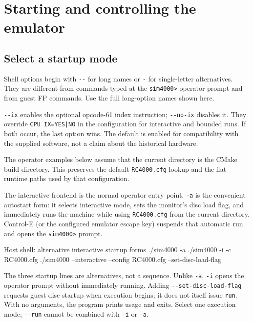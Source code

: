 \chapter{Starting and controlling the emulator}\label{command-line-options}

\section{Select a startup mode}\label{select-a-startup-mode}

Shell options begin with \passthrough{\lstinline!--!} for long names or \passthrough{\lstinline!-!} for single-letter alternatives. They are different from commands typed at the \passthrough{\lstinline!sim4000>!} operator prompt and from guest FP commands. Use the full long-option names shown here.

\passthrough{\lstinline!--ix!} enables the optional opcode-61 index instruction; \passthrough{\lstinline!--no-ix!} disables it. They override \passthrough{\lstinline!CPU IX=YES|NO!} in the configuration for interactive and bounded runs. If both occur, the last option wins. The default is enabled for compatibility with the supplied software, not a claim about the historical hardware.

The operator examples below assume that the current directory is the CMake build directory. This preserves the default \passthrough{\lstinline!RC4000.cfg!} lookup and the flat runtime paths used by that configuration.

The interactive frontend is the normal operator entry point. \passthrough{\lstinline!-a!} is the convenient autostart form: it selects interactive mode, sets the monitor's disc load flag, and immediately runs the machine while using \passthrough{\lstinline!RC4000.cfg!} from the current directory. Control-E (or the configured emulator escape key) suspends that automatic run and opens the \passthrough{\lstinline!sim4000>!} prompt.

\begin{commandexample}[language=sh]{Host shell: alternative interactive startup forms}
./sim4000 -a
./sim4000 -i -c RC4000.cfg
./sim4000 --interactive --config RC4000.cfg --set-disc-load-flag
\end{commandexample}

The three startup lines are alternatives, not a sequence. Unlike \passthrough{\lstinline!-a!}, \passthrough{\lstinline!-i!} opens the operator prompt without immediately running. Adding \passthrough{\lstinline!--set-disc-load-flag!} requests guest disc startup when execution begins; it does not itself issue \passthrough{\lstinline!run!}. With no arguments, the program prints usage and exits. Select one execution mode; \passthrough{\lstinline!--run!} cannot be combined with \passthrough{\lstinline!-i!} or \passthrough{\lstinline!-a!}.

